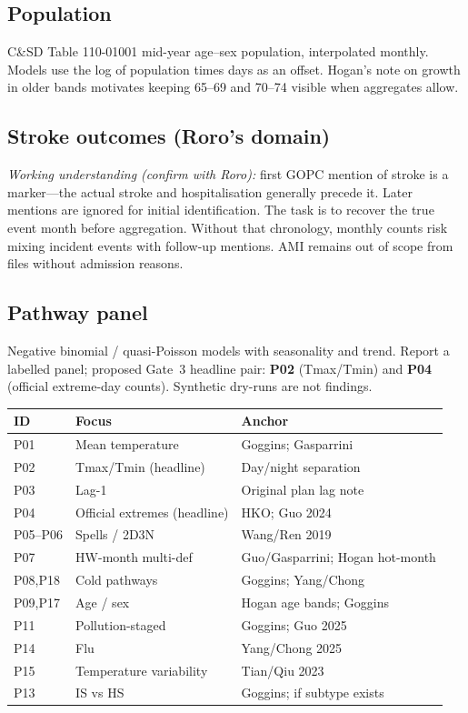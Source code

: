 \documentclass[11pt,a4paper]{article}
\begin{document}
\subsection{Population}
C\&SD Table 110-01001 mid-year age--sex population, interpolated monthly. Models use the log of population times days as an offset. Hogan's note on growth in older bands motivates keeping 65--69 and 70--74 visible when aggregates allow.

\subsection{Stroke outcomes (Roro's domain)}
\textit{Working understanding (confirm with Roro):} first GOPC mention of stroke is a marker---the actual stroke and hospitalisation generally precede it. Later mentions are ignored for initial identification. The task is to recover the true event month before aggregation. Without that chronology, monthly counts risk mixing incident events with follow-up mentions. AMI remains out of scope from files without admission reasons.

\subsection{Pathway panel}
Negative binomial / quasi-Poisson models with seasonality and trend. Report a labelled panel; proposed Gate~3 headline pair: \textbf{P02} (Tmax/Tmin) and \textbf{P04} (official extreme-day counts). Synthetic dry-runs are not findings.

{\footnotesize
\begin{tabular}{@{}llp{}@{}}
\toprule
ID & Focus & Anchor \\
\midrule
P01 & Mean temperature & Goggins; Gasparrini \\
P02 & Tmax/Tmin (headline) & Day/night separation \\
P03 & Lag-1 & Original plan lag note \\
P04 & Official extremes (headline) & HKO; Guo 2024 \\
P05--P06 & Spells / 2D3N & Wang/Ren 2019 \\
P07 & HW-month multi-def & Guo/Gasparrini; Hogan hot-month \\
P08,P18 & Cold pathways & Goggins; Yang/Chong \\
P09,P17 & Age / sex & Hogan age bands; Goggins \\
P11 & Pollution-staged & Goggins; Guo 2025 \\
P14 & Flu & Yang/Chong 2025 \\
P15 & Temperature variability & Tian/Qiu 2023 \\
P13 & IS vs HS & Goggins; if subtype exists \\
\bottomrule
\end{tabular}
}
\end{document}

